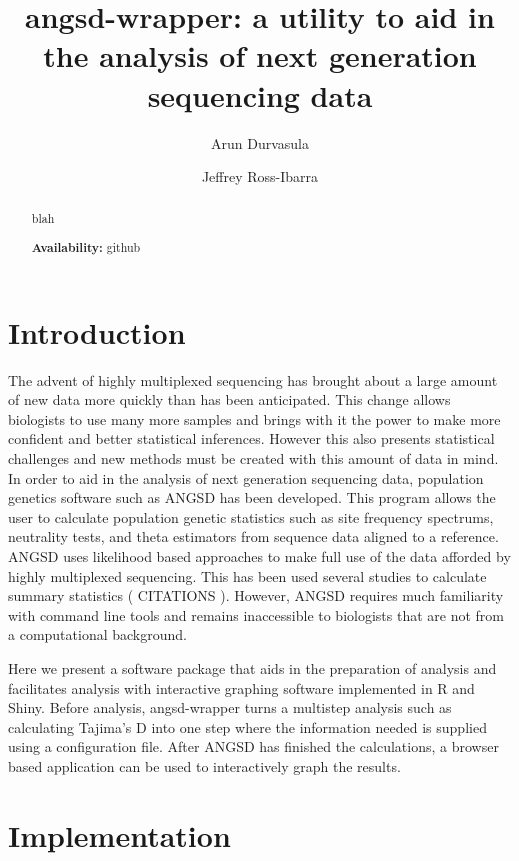 \documentclass[12pt]{article}
\title{angsd-wrapper: a utility to aid in the analysis of next generation sequencing data}
\author[1]{Arun Durvasula}
\author[1,2]{Jeffrey Ross-Ibarra}
\affil[1]{Department of Plant Sciences, University of California Davis}
\affil[2]{Center for Population Biology and Genome Center, University of California Davis}
\date{}
\begin{document}
\maketitle

\begin{abstract}
blah

\textbf{Availability:} github
\end{abstract}

\section*{Introduction}
The advent of highly multiplexed sequencing has brought about a large amount of new data more quickly than has been anticipated. 
This change allows biologists to use many more samples and brings with it the power to make more confident and better statistical inferences.  %
However this also presents statistical challenges and new methods must be created with this amount of data in mind. 
In order to aid in the analysis of next generation sequencing data, population genetics software such as ANGSD has been developed. This program allows the user to calculate population genetic statistics such as site frequency spectrums, neutrality tests, and theta estimators from sequence data aligned to a reference. ANGSD uses likelihood based approaches to make full use of the data afforded by highly multiplexed sequencing. This has been used several studies to calculate summary statistics ( CITATIONS ). However, ANGSD requires much familiarity with command line tools and remains inaccessible to biologists that are not from a computational background. 

Here we present a software package that aids in the preparation of analysis and facilitates analysis with interactive graphing software implemented in R and Shiny. Before analysis, angsd-wrapper turns a multistep analysis such as calculating Tajima's D into one step where the information needed is supplied using a configuration file. After ANGSD has finished the calculations, a browser based application can be used to interactively graph the results.

\section*{Implementation}
\end{document}
